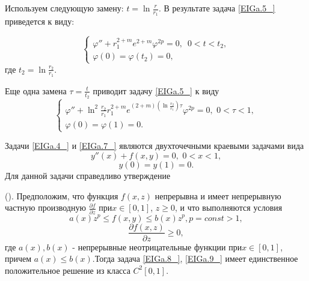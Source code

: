 Используем следующую замену: $t=\ln \frac{r}{r_{1} }$.  В результате задача \eqref{EIGa.5_} приведется к виду:

\begin{equation}
\label{EIGa.6_} \left\{\begin{array}{l} {\varphi ''+r_{1}^{2+m} e^{2+m} \varphi ^{2p} =0,\, \, \, 0<t<t_{2} ,} \\ {\varphi \left(0\right)=\varphi \left(t_{2} \right)=0,} \end{array}\right.
\end{equation}
где $t_{2} =\ln \frac{r_{2} }{r_{1} } $.

Еще одна замена $\tau =\frac{t}{t_{2} } $ приводит задачу \eqref{EIGa.5_} к виду
\begin{equation} \label{EIGa.7_} \left\{\begin{array}{l} {\varphi ''+\ln ^{2} \frac{r_{2} }{r_{1} } r_{1}^{2+m} e^{\left(2+m\right)(\ln ^{} \frac{r_{2} }{r_{1} } )\tau } \varphi ^{2p} =0,\, \, 0<\tau <1,} \\ {\varphi \left(0\right)=\varphi \left(1\right)=0.} \end{array}\right.  \end{equation}

Задачи \eqref{EIGa.4_} и \eqref{EIGa.7_} являются двухточечными краевыми задачами вида
\begin{equation} \label{EIGa.8_} y''(x)+f(x,y)=0,\, \, 0<x<1, \end{equation}
\begin{equation} \label{EIGa.9_} y(0)=y(1)=0. \end{equation}
Для данной задачи справедливо утверждение

\begin{theorem}\label{AbEI3.4:th1}
(\cite{abdurag6}). Предположим, что функция $f(x,z)$ непрерывна и имеет непрерывную частную производную $\frac{\partial f}{\partial z} $ при$x\in \left[0,1\right]$, $z\ge 0$, и что выполняются условия
\begin{equation} \label{EIGa.10_} a(x)z^{p} \le f(x,y)\le b(x)z^{p} ,p=const>1, \end{equation}
\begin{equation} \label{EIGa.11_} \frac{\partial f(x,z)}{\partial z} \ge 0, \end{equation}
где $a(x),b(x)$ - непрерывные неотрицательные функции при$x\in \left[0,1\right]$, причем $a(x)\le b(x)$.Тогда задача \eqref{EIGa.8_}, \eqref{EIGa.9_} имеет единственное положительное решение из класса $C^{2} [0,1]$.
\end{theorem}


